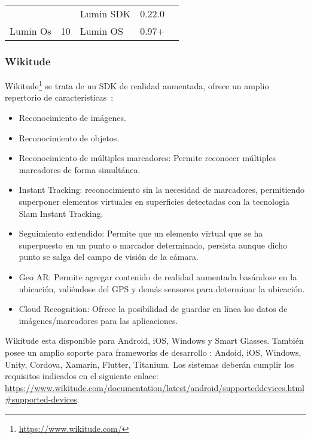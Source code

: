 \begin{table}[]
\begin{tabular}{|l|l|l|l|l|l|}
		&                          & Lumin SDK                                      & 0.22.0                                     & \multicolumn{2}{l|}{}                               \\ \cline{3-4}
		\multirow{-2}{*}{Lumin Os} & \multirow{-2}{*}{10}     & \cellcolor[HTML]{EFEFEF}Lumin OS               & \cellcolor[HTML]{EFEFEF}0.97+              & \multicolumn{2}{l|}{\multirow{-2}{*}{}}             \\ \hline
	\end{tabular}
\end{table}


\subsubsection{Wikitude}

Wikitude\footnote{\url{https://www.wikitude.com/}} se trata de un SDK de realidad aumentada, ofrece un amplio repertorio de características~\cite{wikitude}: 

\begin{itemize}
	\item Reconocimiento de imágenes.
	\item Reconocimiento de objetos.
	\item Reconocimiento de múltiples marcadores: Permite reconocer múltiples marcadores de forma simultánea.
	\item Instant Tracking: reconocimiento sin la necesidad de marcadores, permitiendo superponer elementos virtuales en superficies detectadas con la tecnologia Slam Instant Tracking.	
	\item Seguimiento extendido: Permite que un elemento virtual que se ha superpuesto en un punto o marcador determinado, persista aunque dicho punto se salga del campo de visión de la cámara.	
	\item Geo AR: Permite agregar contenido de realidad aumentada basándose en la ubicación, valiéndose del GPS y demás sensores para determinar la ubicación.
	\item Cloud Recognition: Ofrece la posibilidad de guardar en línea los datos de imágenes/marcadores para las aplicaciones.	
\end{itemize}

Wikitude esta disponible para Android, iOS, Windows y Smart Glasses.
También posee un amplio soporte para frameworks de desarrollo : Andoid, iOS, Windows, Unity, Cordova, Xamarin, Flutter, Titanium. 
Los sistemas deberán cumplir los requisitos indicados en el siguiente enlace: \url{https://www.wikitude.com/documentation/latest/android/supporteddevices.html#supported-devices}.




